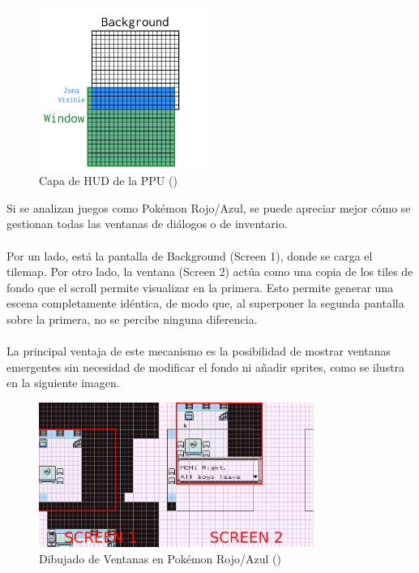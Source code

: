 \begin{figure}[H]
    \centering
    \includegraphics[width=0.5\textwidth]{include/images/grid_window.png}
    \caption{Capa de HUD de la PPU (\cite{gbedg})}
    \label{figure:window_layer}
\end{figure}

Si se analizan juegos como Pokémon Rojo/Azul, se puede apreciar mejor cómo se gestionan todas las ventanas de diálogos o de inventario.
\\\\
Por un lado, está la pantalla de Background (Screen 1), donde se carga el tilemap. Por otro lado, la ventana (Screen 2) actúa como una copia de los tiles de fondo que el scroll permite visualizar en la primera. Esto permite generar una escena completamente idéntica, de modo que, al superponer la segunda pantalla sobre la primera, no se percibe ninguna diferencia.
\\\\
La principal ventaja de este mecanismo es la posibilidad de mostrar ventanas emergentes sin necesidad de modificar el fondo ni añadir sprites, como se ilustra en la siguiente imagen.

\begin{figure}[H]
    \centering
    \includegraphics[width=0.8\textwidth]{include/images/window_pokemon.png}
    \caption{Dibujado de Ventanas en Pokémon Rojo/Azul (\cite{goldensacra})}
    \label{figure:window_pokemon}
\end{figure}


